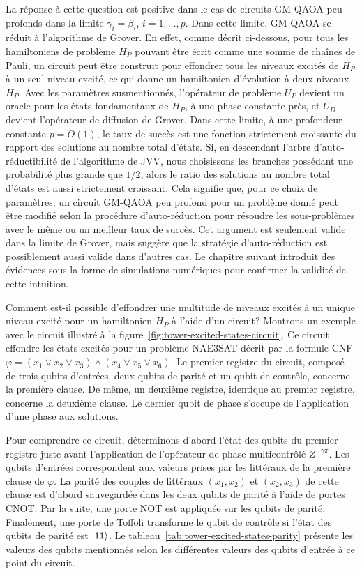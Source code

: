 La réponse à cette question est positive dans le cas de circuits GM-QAOA peu profonds dans la limite $\gamma_{i}=\beta_{i}$, $i=1,\dots,p$. Dans cette limite, GM-QAOA se réduit à l'algorithme de Grover. En effet, comme décrit ci-dessous, pour tous les hamiltoniens de problème $H_{P}$ pouvant être écrit comme une somme de chaînes de Pauli, un circuit peut être construit pour effondrer tous les niveaux excités de $H_{P}$ à un seul niveau excité, ce qui donne un hamiltonien d'évolution à deux niveaux $H_{P}$. Avec les paramètres susmentionnés, l'opérateur de problème $U_{P}$ devient un oracle pour les états fondamentaux de $H_{P}$, à une phase constante près, et $U_{D}$ devient l'opérateur de diffusion de Grover. Dans cette limite, à une profondeur constante $p=O(1)$, le taux de succès est une fonction strictement croissante du rapport des solutions au nombre total d'états. Si, en descendant l'arbre d'auto-réductibilité de l'algorithme de JVV, nous choisissons les branches possédant une probabilité plus grande que $1/2$, alors le ratio des solutions au nombre total d'états est aussi strictement croissant. Cela signifie que, pour ce choix de paramètres, un circuit GM-QAOA peu profond pour un problème donné peut être modifié selon la procédure d'auto-réduction pour résoudre les sous-problèmes avec le même ou un meilleur taux de succès. Cet argument est seulement valide dans la limite de Grover, mais suggère que la stratégie d'auto-réduction est possiblement aussi valide dans d'autres cas. Le chapitre suivant introduit des évidences sous la forme de simulations numériques pour confirmer la validité de cette intuition.

Comment est-il possible d'effondrer une multitude de niveaux excités à un unique niveau excité pour un hamiltonien $H_{P}$ à l'aide d'un circuit? Montrons un exemple avec le circuit illustré à la figure~\ref{fig:tower-excited-states-circuit}. Ce circuit effondre les états excités pour un problème NAE3SAT décrit par la formule CNF $\varphi = (x_{1} \lor x_{2} \lor x_{3}) \land (x_{4} \lor x_{5} \lor x_{6})$. Le premier registre du circuit, composé de trois qubits d'entrées, deux qubits de parité et un qubit de contrôle, concerne la première clause. De même, un deuxième registre, identique au premier registre, concerne la deuxième clause. Le dernier qubit de phase s'occupe de l'application d'une phase aux solutions.

Pour comprendre ce circuit, déterminons d'abord l'état des qubits du premier registre juste avant l'application de l'opérateur de phase multicontrôlé $Z^{-\gamma \pi}$. Les qubits d'entrées correspondent aux valeurs prises par les littéraux de la première clause de $\varphi$. La parité des couples de littéraux $(x_{1}, x_{2})$ et $(x_{2}, x_{3})$ de cette clause est d'abord sauvegardée dans les deux qubits de parité à l'aide de portes CNOT. Par la suite, une porte NOT est appliquée sur les qubits de parité. Finalement, une porte de Toffoli transforme le qubit de contrôle si l'état des qubits de parité est $\ket{11}$. Le tableau~\ref{tab:tower-excited-states-parity} présente les valeurs des qubits mentionnés selon les différentes valeurs des qubits d'entrée à ce point du circuit.

